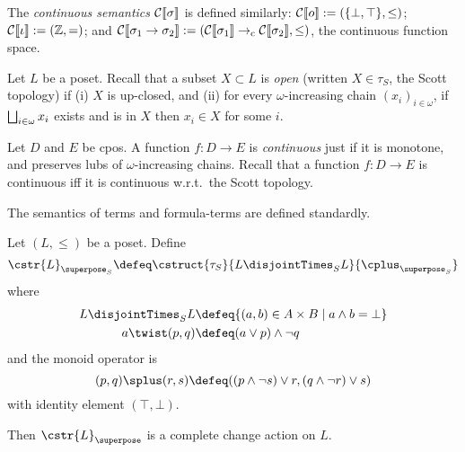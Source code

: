 The \emph{continuous semantics} $\mathcal{C}\llbracket \sigma \rrbracket$ is defined similarly: $\mathcal{C}\llbracket o \rrbracket := (\{\bot, \top\}, \leq)$; $\mathcal{C}\llbracket \iota \rrbracket := (\mathbb{Z}, =)$; and $\mathcal{C}\llbracket \sigma_1 \to \sigma_2 \rrbracket := (\mathcal{C}\llbracket \sigma_1 \rrbracket \to_{\rm c} \mathcal{C}\llbracket \sigma_2 \rrbracket, \leq)$, the continuous function space.

Let $L$ be a poset. 
Recall that a subset $X \subset L$ is \emph{open} (written $X \in \tau_S$, the Scott topology) if (i) $X$ is up-closed, and (ii) for every $\omega$-increasing chain $(x_i)_{i \in \omega}$, if $\bigsqcup_{i \in \omega} x_i$ exists and is in $X$ then $x_i \in X$ for some $i$. 


Let $D$ and $E$ be cpos. 
A function $f:D \to E$ is \emph{continuous} just if it is monotone, and preserves lubs of $\omega$-increasing chains.
Recall that a function $f : D \to E$ is continuous iff it is continuous w.r.t.~the Scott topology.

The semantics of terms and formula-terms are defined standardly. 

\begin{prop}[name=Scott change actions, restate=hodatalog]
 Let $(L, \leq)$ be a poset. Define
  \begin{displaymath}
    \cstr{L}_{\superposeS} 
    \defeq \cstruct{\tau_S
    }{L \disjointTimesS L}{\twistS}
  \end{displaymath}
  where
  \begin{align*}
    L \disjointTimesS L &\defeq \{ (a, b) \in A \times B \mid a \wedge b = \bot \}\\
    a \twist (p, q) &\defeq (a \vee p) \wedge \neg q
  \end{align*}
  and the monoid operator is
  \begin{displaymath}
    (p, q) \splus (r, s) \defeq ((p \wedge \neg s) \vee r, (q \wedge \neg r) \vee s)
  \end{displaymath}
  with identity element $(\top, \bot)$.

  Then $\cstr{L}_\superpose$ is a complete change action on $L$.
\end{prop}

